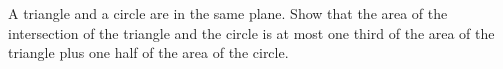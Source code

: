 A triangle and a circle are in the same plane. Show that the area of the intersection of the triangle and the circle is at most one third of the area of the triangle plus one half of the area of the circle.
